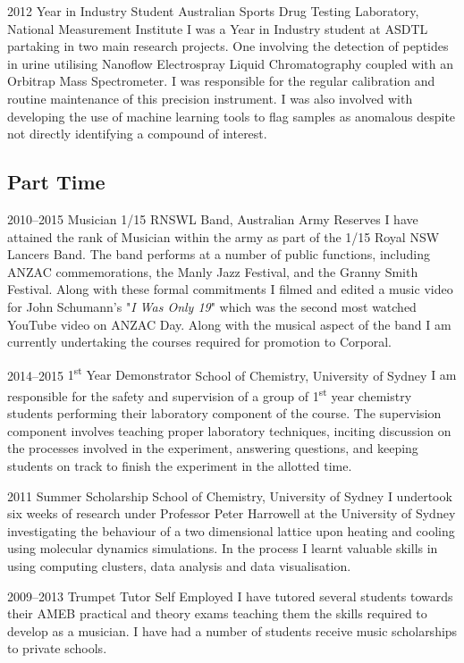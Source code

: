 \cventry
{2012}
{Year in Industry Student}
{Australian Sports Drug Testing Laboratory, National Measurement Institute}
{}{}
{I was a Year in Industry student at ASDTL partaking in two main research projects. One involving the detection of peptides in urine utilising Nanoflow Electrospray Liquid Chromatography coupled with an Orbitrap Mass Spectrometer. I was responsible for the regular calibration and routine maintenance of this precision instrument. I was also involved with developing the use of machine learning tools to flag samples as anomalous despite not directly identifying a compound of interest.}

\subsection{Part Time}

\cventry
{2010--2015}
{Musician}
{1/15 RNSWL Band, Australian Army Reserves}
{}{}
{I have attained the rank of Musician within the army as part of the 1/15 Royal NSW Lancers Band. The band performs at a number of public functions, including ANZAC commemorations, the Manly Jazz Festival, and the Granny Smith Festival. Along with these formal commitments I filmed and edited a music video for John Schumann's "\emph{I Was Only 19}" which was the second most watched YouTube video on ANZAC Day. Along with the musical aspect of the band I am currently undertaking the courses required for promotion to Corporal.}

\cventry
{2014--2015}
{1\textsuperscript{st} Year Demonstrator}
{School of Chemistry, University of Sydney}
{}{}
{I am responsible for the safety and supervision of a group of 1\textsuperscript{st} year chemistry students performing their laboratory component of the course. The supervision component involves teaching proper laboratory techniques, inciting discussion on the processes involved in the experiment, answering questions, and keeping students on track to finish the experiment in the allotted time.}

\cventry
{2011}
{Summer Scholarship}
{School of Chemistry, University of Sydney}
{}{}
{I undertook six weeks of research under Professor Peter Harrowell at the University of Sydney investigating the behaviour of a two dimensional lattice upon heating and cooling using molecular dynamics simulations. In the process I learnt valuable skills in using computing clusters, data analysis and data visualisation.}

\cventry
{2009--2013}
{Trumpet Tutor}
{Self Employed}
{}{}
{I have tutored several students towards their AMEB practical and theory exams teaching them the skills required to develop as a musician. I have had a number of students receive music scholarships to private schools.}

